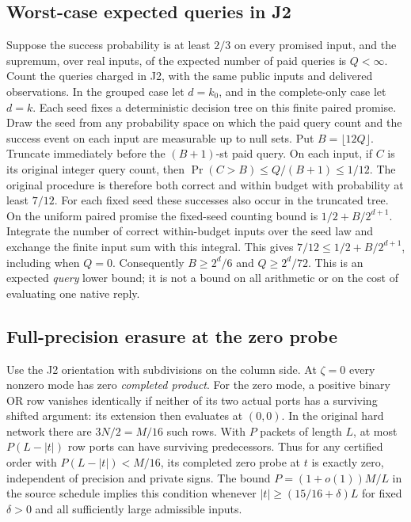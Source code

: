 \documentclass[11pt,a4paper]{article}
\begin{document}
\subsection{Worst-case expected queries in J2}
Suppose the success probability is at least \(2/3\) on every promised
input, and the supremum, over real inputs, of the expected number of
paid queries is \(Q<\infty\). Count the queries charged in J2, with the
same public inputs and delivered observations. In the grouped case let
\(d=k_0\), and in the complete-only case let \(d=k\).
Each seed fixes a deterministic decision tree on this finite paired
promise. Draw the seed from any probability space on which the paid query
count and the success event on each input are measurable up to null
sets. Put \(B=\lfloor12Q\rfloor\). Truncate immediately before the
\((B+1)\)-st paid query. On each input, if \(C\) is its original
integer query count, then \(\Pr(C>B)\le Q/(B+1)\le 1/12\).
The original procedure is therefore both correct and within budget
with probability at least \(7/12\). For each fixed seed these successes
also occur in the truncated tree. On the uniform paired promise the
fixed-seed counting bound is \(1/2+B/2^{d+1}\). Integrate the number
of correct within-budget inputs over the seed law and exchange the
finite input sum with this integral. This gives
\(7/12\le 1/2+B/2^{d+1}\), including when \(Q=0\).
Consequently \(B\ge 2^d/6\) and \(Q\ge 2^d/72\). This is an expected
\emph{query} lower bound; it is not a bound on all arithmetic or on
the cost of evaluating one native reply.

\subsection{Full-precision erasure at the zero probe}
Use the J2 orientation with subdivisions on the column side.
At \(\zeta=0\) every nonzero mode has zero \emph{completed product}.
For the zero mode, a positive binary OR row vanishes identically
if neither of its two actual ports has a surviving shifted argument:
its extension then evaluates at \((0,0)\). In the original hard
network there are \(3N/2=M/16\) such rows. With \(P\) packets of length
\(L\), at most \(P(L-|t|)\) row ports can have surviving predecessors.
Thus for any certified order with \(P(L-|t|)<M/16\), its completed
zero probe at \(t\) is exactly zero, independent of precision and
private signs. The bound \(P=(1+o(1))M/L\) in the source schedule
implies this condition whenever \(|t|\ge(15/16+\delta)L\) for fixed
\(\delta>0\) and all sufficiently large admissible inputs.
\end{document}
